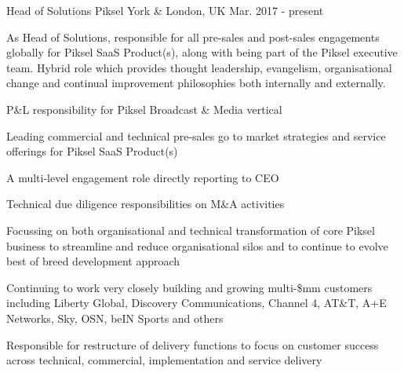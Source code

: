 \begin{cventries}
\cvexpentry
{Head of Solutions} %
{Piksel} %
{York \& London, UK} %
{Mar. 2017 - present} %
{
\begin{cvitemstitle}
\item {As Head of Solutions, responsible for all pre-sales and post-sales engagements globally for Piksel SaaS Product(s), along with being part of the Piksel executive team. Hybrid role which provides thought leadership, evangelism, organisational change and continual improvement philosophies both internally and externally.}
\end{cvitemstitle}
}
{ %
\begin{cvitems}
\item {P\&L responsibility for Piksel Broadcast \& Media vertical}
\item {Leading commercial and technical pre-sales go to market strategies and service offerings for Piksel SaaS Product(s)}
\item {A multi-level engagement role directly reporting to CEO}
\item {Technical due diligence responsibilities on M\&A activities}
\item {Focussing on both organisational and technical transformation of core Piksel business to streamline and reduce organisational silos and to continue to evolve best of breed development approach}
\item {Continuing to work very closely building and growing multi-\$mm customers including Liberty Global, Discovery Communications, Channel 4, AT\&T, A+E Networks, Sky, OSN, beIN Sports and others}
\item {Responsible for restructure of delivery functions to focus on customer success across technical, commercial, implementation and service delivery}
\end{cvitems}
}



\end{cventries}
